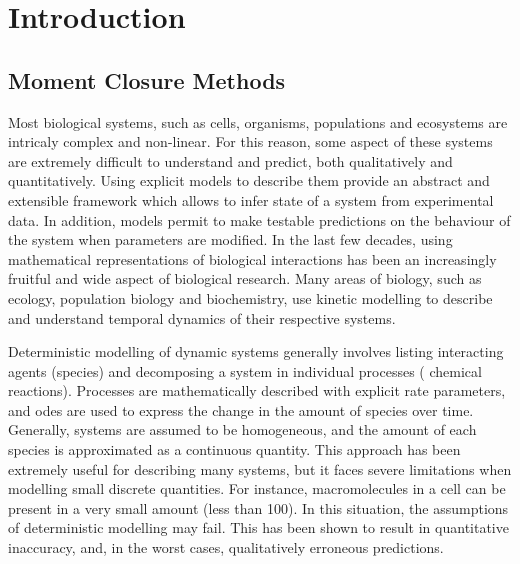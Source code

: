 \section{Introduction} \label{intro}
\subsection{Moment Closure Methods}

Most biological systems, such as cells, organisms, populations and ecosystems are intricaly complex and non-linear.
For this reason, some aspect of these systems are extremely difficult to understand and predict, both qualitatively and quantitatively\cite{klipp_systems_2013}.
Using explicit models to describe them provide an abstract and extensible
framework which allows to infer state of a system from experimental data.
In addition, models permit to make testable predictions on the behaviour of the system when parameters are modified.
In the last few decades, using mathematical representations of biological interactions has been an increasingly fruitful and wide aspect of biological research.
Many areas of biology, such as ecology, population biology and biochemistry,
use kinetic modelling to describe and understand temporal dynamics of their respective systems.

Deterministic modelling of dynamic systems generally involves listing
interacting agents (species) and decomposing a system in individual processes (\eg{} chemical reactions).
Processes are mathematically described with explicit rate parameters, and \glspl{ode} are used to express the change in the amount of species over time.
Generally, systems are assumed to be homogeneous, and the amount of each species is approximated as a continuous quantity.
This approach has been extremely useful for describing many systems, but it faces severe limitations when modelling small discrete quantities.
For instance, macromolecules in a cell can be present in a very small amount (less than 100).
In this situation, the assumptions of deterministic modelling may fail.
This has been shown to result in quantitative inaccuracy, and, in the worst cases, qualitatively erroneous predictions.


